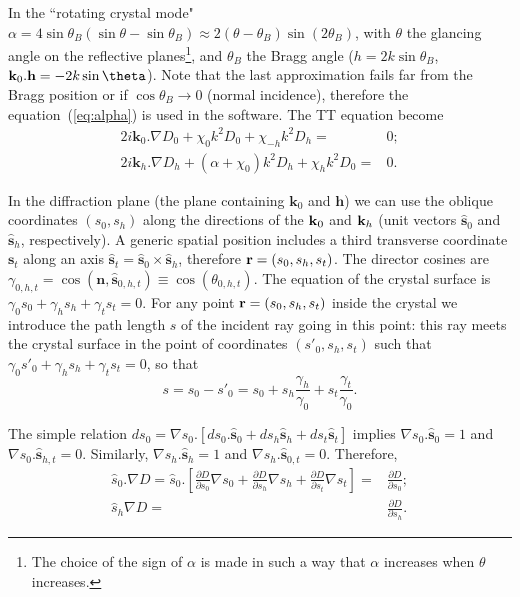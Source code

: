 \documentclass[preprint]{iucr}              %
\begin{document}
In the ``rotating crystal mode" $\alpha=4 \sin \theta_B (\sin \theta - \sin \theta_B) \approx 2 (\theta-\theta_B) \sin (2\theta_B)$, with $\theta$ the glancing angle on the reflective planes\footnote{
The choice of the sign of $\alpha$ is made in such a way that $\alpha$ increases when $\theta$ increases. 
}, and $\theta_B$ the Bragg angle ($h=2 k \sin\theta_B$, $\textbf k_0 . \textbf h = -2 k \sin\theta$). Note that the last approximation fails far from the Bragg position or if $\cos\theta_B \rightarrow 0$ (normal incidence), therefore the equation~(\ref{eq:alpha}) is used in the software.
The TT equation become
\begin{subequations}
\label{eq:TTvectorAlpha}
\begin{align}
2 i \textbf{k}_0 . \nabla D_0 + \chi_0 k^2 D_0 + \chi_{-h} k^2 D_h =& 0; \\
2 i \textbf{k}_h . \nabla D_h + (\alpha + \chi_0) k^2 D_h + \chi_{h} k^2 D_0 =& 0.
\end{align}
\end{subequations}

In the diffraction plane (the plane containing $\textbf{k}_0$ and $\textbf{h}$) 
we can use the oblique coordinates $(s_0,s_h)$ along the directions of the $\textbf k_0$ and $\textbf k_h$ (unit vectors $\hat{ \textbf{s}}_{0}$ and $\hat{ \textbf{s}}_{h}$, respectively). A generic spatial position includes a third transverse coordinate $\textbf{s}_t$ along an axis $\hat{\textbf{s}}_t=\hat{\textbf{s}}_0 \times \hat{\textbf{s}}_h$, therefore $\textbf r=(s_0,s_h,s_t)$. The director cosines are $\gamma_{0,h,t}=\cos(\textbf{n} , \hat{\textbf{s}}_{0,h,t}) \equiv \cos(\theta_{0,h,t})$. The equation of the crystal surface is $\gamma_0 s_0 + \gamma_h s_h + \gamma_t s_t=0$. For any point $\textbf r=(s_0,s_h,s_t)$ inside the crystal we introduce the path length $s$ of the incident ray going in this point: this ray meets the crystal surface in the point of coordinates $(s'_0,s_h,s_t)$ such that $\gamma_0 s'_0+\gamma_h s_h + \gamma_t s_t=0$, so that 
\begin{equation}
\label{eq:s}
s = s_0 - s'_0 = s_0 + s_h \frac{\gamma_h}{\gamma_0} + s_t \frac{\gamma_t}{\gamma_0}.
\end{equation}

The simple relation $d s_0 = \nabla s_0 . [ d s_0 . \hat{\textbf{s}}_0 + d s_h \hat{\textbf{s}}_h + d s_t \hat{\textbf{s}}_t ]$ implies $\nabla s_0 . \hat{\textbf{s}}_0=1$ and $\nabla s_0 . \hat{\textbf{s}}_{h,t}=0$. Similarly, $\nabla s_h . \hat{\textbf{s}}_h=1$ and $\nabla s_h . \hat{\textbf{s}}_{0,t}=0$. Therefore, 
\begin{subequations}
\label{eq:equalities}
\begin{align}
\hat s_0 . \nabla D=
\hat s_0 . \left[ 
\frac{\partial D}{\partial s_0} \nabla s_0 + 
\frac{\partial D}{\partial s_h} \nabla s_h +
\frac{\partial D}{\partial s_t} \nabla s_t
\right] 
=& \frac{\partial D}{\partial s_0}
; \\
\hat s_h \nabla D =& 
\frac{\partial D}{\partial s_h}.
\end{align}
\end{subequations}
\end{document}
